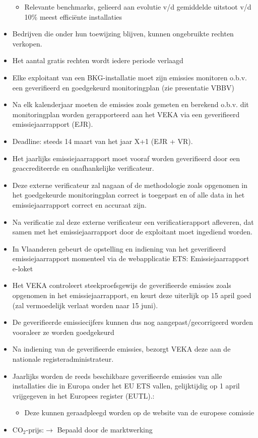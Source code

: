 \documentclass[12pt]{article}
\begin{document}
\begin{itemize}
\begin{itemize}
        \item Relevante benchmarks, gelieerd aan evolutie v/d gemiddelde uitstoot v/d 10\% meest efficiënte installaties
    \end{itemize}    
    \item Bedrijven die onder hun toewijzing blijven, kunnen ongebruikte rechten verkopen.
    \item Het aantal gratis rechten wordt iedere periode verlaagd
    \item Elke exploitant van een BKG-installatie moet zijn emissies monitoren o.b.v. een geverifieerd en goedgekeurd monitoringplan (zie presentatie VBBV)
    \item Na elk kalenderjaar moeten de emissies zoals gemeten en berekend o.b.v. dit monitoringplan
    worden gerapporteerd aan het VEKA via een geverifieerd emissiejaarrapport (EJR).
    \item Deadline: steeds 14 maart van het jaar X+1 (EJR + VR).
    \item Het jaarlijks emissiejaarrapport moet vooraf worden geverifieerd door een geaccrediteerde en
    onafhankelijke verificateur.
    \item Deze externe verificateur zal nagaan of de methodologie zoals opgenomen in het goedgekeurde
    monitoringplan correct is toegepast en of alle data in het emissiejaarrapport correct en accuraat zijn.
    \item Na verificatie zal deze externe verificateur een verificatierapport afleveren, dat samen met het emissiejaarrapport door de exploitant moet ingediend worden.
    \item In Vlaanderen gebeurt de opstelling en indiening van het geverifieerd emissiejaarrapport
    momenteel via de webapplicatie ETS: Emissiejaarrapport e-loket
    \item Het VEKA controleert steekproefsgewijs de geverifieerde emissies zoals opgenomen in het
    emissiejaarrapport, en keurt deze uiterlijk op 15 april goed (zal vermoedelijk verlaat worden naar 15 juni).
    \item De geverifieerde emissiecijfers kunnen dus nog aangepast/gecorrigeerd worden vooraleer ze
    worden goedgekeurd
    \item Na indiening van de geverifieerde emissies, bezorgt VEKA deze aan de nationale
    registeradministrateur.
    \item Jaarlijks worden de reeds beschikbare geverifieerde emissies van alle installaties die in Europa onder het EU ETS vallen, gelijktijdig op 1 april vrijgegeven in het Europees register (EUTL).:\begin{itemize}
        \item Deze kunnen geraadpleegd worden op de website van de europese comissie
    \end{itemize}
    \item CO$_2$-prijs:$\rightarrow$ Bepaald door de marktwerking
\end{itemize}
\end{document}
